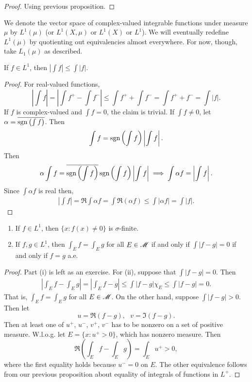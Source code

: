 \documentclass[12pt]{article} %
\begin{document}
\begin{proof}
    Using previous proposition.
\end{proof}

We denote the vector space of complex-valued integrable functions under measure $\mu$ by $L^1(\mu)$ (or $L^1(X, \mu)$ or $L^1(X)$ or $L^1$). We will eventually redefine $L^1(\mu)$ by quotienting out equivalencies almost everywhere. For now, though, take $L_1(\mu)$ as described.

\begin{proposition}
    If $f \in L^1$, then $\left| \int f \right| \leq \int |f|$.
\end{proposition}

\begin{proof}
    For real-valued functions, \[\left|\int f\right| = \left| \int f^+ - \int f^-\right| \leq \int f^+ + \int f^- = \int f^+ + f^- = \int |f|.\] If $f$ is complex-valued and $\int f = 0$, the claim is trivial. If $\int f \neq 0$, let $\alpha = \overline{\operatorname{sgn} \left(\int f\right)}$. Then \[\int f = \operatorname{sgn} \left(\int f \right) \left|\int f\right|.\] Then \[\alpha \int f = \overline{\operatorname{sgn} \left(\int f\right)} \operatorname{sgn} \left(\int f \right) \left|\int f\right| \implies \int \alpha f = \left|\int f\right|.\] Since $\int \alpha f$ is real then, \begin{align*}
        \left|\int f\right| = \Re \int \alpha f = \int \Re(\alpha f) \leq \int |\alpha f| = \int |f|.
    \end{align*}
\end{proof}

\begin{proposition}\label{prop:integrable-functions-equal-ae}
    \begin{enumerate}
        \item If $f \in L^1$, then $\{x : f(x) \neq 0\}$ is $\sigma$-finite.
        \item If $f, g \in L^1$, then $\int_E f = \int_E g$ for all $E \in \mathscr{M}$ if and only if $\int |f - g| = 0$ if and only if $f = g$ a.e.
    \end{enumerate}
\end{proposition}

\begin{proof}
    Part (i) is left as an exercise. For (ii), suppose that $\int |f - g| = 0$. Then \begin{align*}
        \left| \int_E f - \int_E g \right| = \left|\int_E f-g\right| \leq \int |f-g| \chi_E \leq \int |f-g| = 0.
    \end{align*} That is, $\int_E f = \int_E g$ for all $E \in \mathscr{M}$. On the other hand, suppose $\int |f - g| > 0$. Then let \[u = \Re(f-g), \ \ \ v = \Im (f-g).\] Then at least one of $u^+$, $u^-$, $v^+$, $v^-$ has to be nonzero on a set of positive measure. W.l.o.g. let $E = \{x : u^+ > 0\}$, which has nonzero measure. Then \[\Re\left(\int_E f - \int_E g\right) = \int_E u^+ > 0,\] where the first equality holds because $u^- = 0$ on $E$. The other equivalence follows from our previous proposition about equality of integrals of functions in $L^+$. 
\end{proof}
\end{document}
